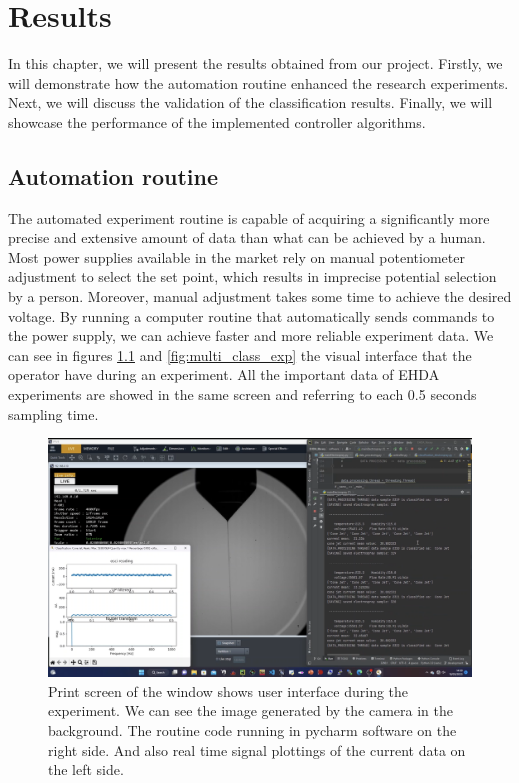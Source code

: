 \chapter{Results}
\label{chap:Results}

In this chapter, we will present the results obtained from our project. Firstly, we will demonstrate how the automation routine enhanced the research experiments. Next, we will discuss the validation of the classification results. Finally, we will showcase the performance of the implemented controller algorithms.

\section{Automation routine}
\label{sec:automation_routine}

The automated experiment routine is capable of acquiring a significantly more precise and extensive amount of data than what can be achieved by a human. Most power supplies available in the market rely on manual potentiometer adjustment to select the set point, which results in imprecise potential selection by a person. Moreover, manual adjustment takes some time to achieve the desired voltage. By running a computer routine that automatically sends commands to the power supply, we can achieve faster and more reliable experiment data.
We can see in figures \ref{fig:multi_class_exp1} and \ref{fig:multi_class_exp} the visual interface that the operator have during an experiment. All the important data of EHDA experiments are showed in the same screen and referring to each 0.5 seconds sampling time.

\begin{figure}[H]
    \center
    \includegraphics[width=17cm]{Figuras/19:03/axs1.png}
    \caption{Print screen of the window shows user interface during the experiment.
        We can see the image generated by the camera in the background.
        The routine code running in pycharm software on the right side.
        And also real time signal plottings of the current data on the left side.}
        \label{fig:multi_class_exp1}
\end{figure}


